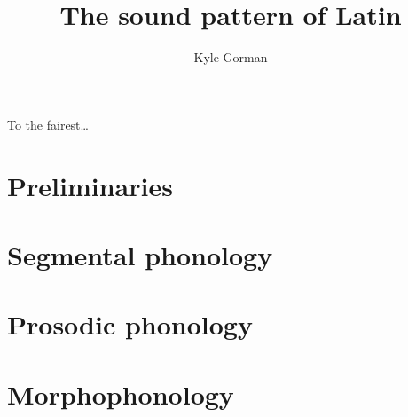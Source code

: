 \documentclass[draft,12pt]{book}
\title{The sound pattern of {Latin}}
\author{Kyle Gorman}
\date{}
\newenvironment{dedication}%
{\thispagestyle{empty}\cleardoublepage\thispagestyle{empty}\vspace*{\stretch{1}}\hfill\begin{minipage}[t]{0.66\textwidth}\raggedright}%
{\end{minipage}\vspace*{\stretch{3}}\clearpage\thispagestyle{empty}}
\begin{document}
\frontmatter
\maketitle
\begin{dedication}
To the fairest\ldots{}
\end{dedication}
\tableofcontents


\mainmatter
\part{Preliminaries}


\part{Segmental phonology}


\part{Prosodic phonology}



\part{Morphophonology}




\appendix



\backmatter


\end{document}
